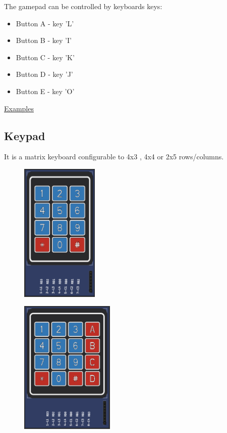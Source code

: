 The gamepad can be controlled by keyboards keys:
\begin{itemize}
 \item Button A - key 'L'
 \item Button B - key 'I'
 \item Button C - key 'K'
 \item Button D - key 'J'
 \item Button E - key 'O'
 \end{itemize}


\href{https://lcgamboa.github.io/picsimlab_examples/parts_Gamepad_(Analogic).html}{Examples}

\subsection{Keypad}

It is a matrix keyboard configurable to 4x3 , 4x4 or 2x5 rows/columns.

\begin{figure}[H]
\center
\includegraphics[width=0.33\textwidth]{img/part_keyb_4x3.png} 
\end{figure} 

\begin{figure}[H]
\center
\includegraphics[width=0.4\textwidth]{img/part_keyb_4x4.png} 
\end{figure} 

